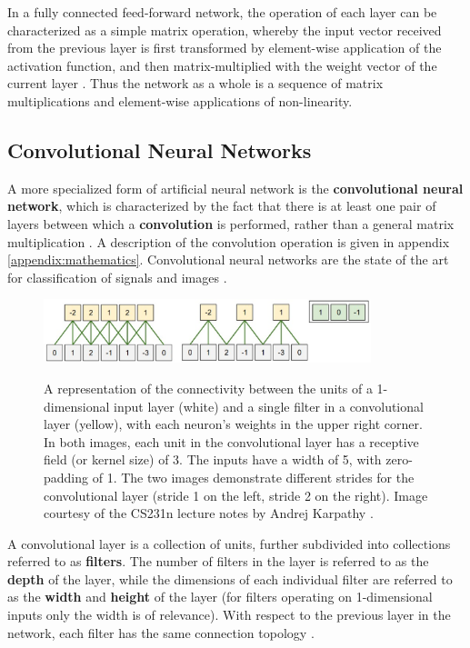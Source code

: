 \documentclass[12pt, titlepage]{report}
\theoremstyle{definition}
\begin{document}
In a fully connected feed-forward network, the operation of each layer can be characterized as a simple matrix operation, whereby the input vector received from the previous layer is first transformed by element-wise application of the activation function, and then matrix-multiplied with the weight vector of the current layer \cite[p. 170-171]{goodfellow2016deep}. Thus the network as a whole is a sequence of matrix multiplications and element-wise applications of non-linearity.



\subsection{Convolutional Neural Networks}
A more specialized form of artificial neural network is the \textbf{convolutional neural network}, which is characterized by the fact that there is at least one pair of layers between which a \textbf{convolution} is performed, rather than a general matrix multiplication \cite[p. 326]{goodfellow2016deep}. A description of the convolution operation is given in appendix \ref{appendix:mathematics}. Convolutional neural networks are the state of the art for classification of signals and images \cite[p. 326]{goodfellow2016deep}.

\begin{figure}
\centering
\includegraphics[width=0.85\textwidth]{img/convolution.png}\\
\caption{A representation of the connectivity between the units of a 1-dimensional input layer (white) and a single filter in a convolutional layer (yellow), with each neuron's weights in the upper right corner. In both images, each unit in the convolutional layer has a receptive field (or kernel size) of 3. The inputs have a width of 5, with zero-padding of 1. The two images demonstrate different strides for the convolutional layer (stride 1 on the left, stride 2 on the right). Image courtesy of the CS231n lecture notes by Andrej Karpathy \cite[Convolutional Neural Networks: Architectures, Convolution / Pooling Layers]{karpathy2017cs231n}.}
\label{figure:convolution1d}
\end{figure}

A convolutional layer is a collection of units, further subdivided into collections referred to as \textbf{filters}. The number of filters in the layer is referred to as the \textbf{depth} of the layer, while the dimensions of each individual filter are referred to as the \textbf{width} and \textbf{height} of the layer (for filters operating on 1-dimensional inputs only the width is of relevance). With respect to the previous layer in the network, each filter has the same connection topology \cite[Convolutional Neural Networks: Architectures, Convolution / Pooling Layers]{karpathy2017cs231n}.
\end{document}
